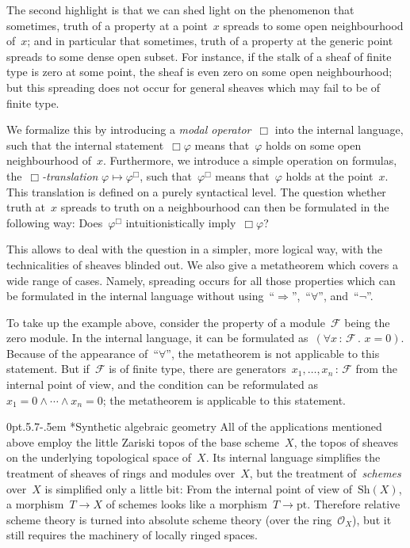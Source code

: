 \documentclass[10pt,reqno,a4paper]{amsbook}
\makeatletter
\theoremstyle{definition}
\theoremstyle{plain}
\theoremstyle{remark}
\newcommand{\F}{\mathcal{F}}
\renewcommand{\O}{\mathcal{O}}
\newcommand{\Sh}{\mathrm{Sh}}
\newcommand{\pt}{\mathrm{pt}}
\newcommand{\?}{\,{:}\,}
\renewcommand{\_}{\mathpunct{.}\,}
\def\subsection{\@startsection{subsection}{2}%
  {0pt}{.5\linespacing\@plus.7\linespacing}{-.5em}%
  {\normalfont\bfseries}}
\makeatother
\begin{document}
{The second highlight is that we can shed light on the phenomenon that
sometimes, truth of a property at a point~$x$ spreads to some open
neighbourhood of~$x$; and in particular that sometimes, truth of a property at
the generic point spreads to some dense open subset. For instance, if the stalk
of a sheaf of finite type is zero at some point, the sheaf is even zero on some
open neighbourhood; but this spreading does not occur for general sheaves which
may fail to be of finite type.

We formalize this by introducing a \emph{modal operator}~$\Box$ into the
internal language, such that the internal statement~$\Box\varphi$ means
that~$\varphi$ holds on some open neighbourhood of~$x$. Furthermore, we
introduce a simple operation on formulas, the~\emph{$\Box$-translation}
$\varphi \mapsto \varphi^\Box$, such that~$\varphi^\Box$ means that~$\varphi$
holds at the point~$x$. This translation is defined on a purely syntactical
level. The question whether truth at~$x$ spreads to truth on a
neighbourhood can then be formulated in the following way: Does~$\varphi^\Box$
intuitionistically imply~$\Box\varphi$?

This allows to deal with the question in a simpler, more logical way, with the
technicalities of sheaves blinded out. We also give a metatheorem which
covers a wide range of cases. Namely, spreading occurs for all those properties
which can be formulated in the internal language without
using~``$\Rightarrow$'',~``$\forall$'', and~``$\neg$''.

To take up the example above, consider the property of a module~$\F$ being
the zero module. In the internal language, it can be formulated as~$(\forall x\?\F\_ x = 0)$.
Because of the appearance of~``$\forall$'', the metatheorem is not
applicable to this statement. But if~$\F$ is of finite type, there are
generators~$x_1,\ldots,x_n\?\F$ from the internal point of view, and the
condition can be reformulated as~$x_1 = 0 \wedge \cdots \wedge x_n = 0$; the
metatheorem is applicable to this statement.


\subsection*{Synthetic algebraic geometry}
All of the applications mentioned above employ the little Zariski topos of the base
scheme~$X$, the topos of sheaves on the underlying topological space of~$X$.
Its internal language simplifies the treatment of sheaves of rings and modules
over~$X$, but the treatment of~\emph{schemes} over~$X$ is simplified only a
little bit: From the internal point of view of~$\Sh(X)$, a morphism~$T \to X$
of schemes looks like a morphism~$T \to \pt$. Therefore relative scheme theory
is turned into absolute scheme theory (over the ring~$\O_X$), but it still
requires the machinery of locally ringed spaces.

}
\end{document}
